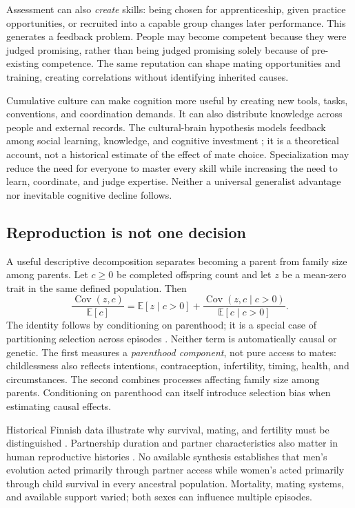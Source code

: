 \documentclass[10pt,twocolumn,letterpaper]{article}
\newcommand{\E}{\mathbb{E}}
\newcommand{\Cov}{\operatorname{Cov}}
\begin{document}
Assessment can also \emph{create} skills: being chosen for apprenticeship, given practice opportunities, or recruited into a capable group changes later performance. This generates a feedback problem. People may become competent because they were judged promising, rather than being judged promising solely because of pre-existing competence. The same reputation can shape mating opportunities and training, creating correlations without identifying inherited causes.

Cumulative culture can make cognition more useful by creating new tools, tasks, conventions, and coordination demands. It can also distribute knowledge across people and external records. The cultural-brain hypothesis models feedback among social learning, knowledge, and cognitive investment \citep{cultural}; it is a theoretical account, not a historical estimate of the effect of mate choice. Specialization may reduce the need for everyone to master every skill while increasing the need to learn, coordinate, and judge expertise. Neither a universal generalist advantage nor inevitable cognitive decline follows.

\subsection{Reproduction is not one decision}
A useful descriptive decomposition separates becoming a parent from family size among parents. Let $c\geq0$ be completed offspring count and let $z$ be a mean-zero trait in the same defined population. Then
\begin{equation}
\frac{\Cov(z,c)}{\E[c]}=
\E[z\mid c>0]+\frac{\Cov(z,c\mid c>0)}{\E[c\mid c>0]}.
\label{eq:episodes}
\end{equation}
The identity follows by conditioning on parenthood; it is a special case of partitioning selection across episodes \citep{arnold1984}. Neither term is automatically causal or genetic. The first measures a \emph{parenthood component}, not pure access to mates: childlessness also reflects intentions, contraception, infertility, timing, health, and circumstances. The second combines processes affecting family size among parents. Conditioning on parenthood can itself introduce selection bias when estimating causal effects.

Historical Finnish data illustrate why survival, mating, and fertility must be distinguished \citep{courtiol2012}. Partnership duration and partner characteristics also matter in human reproductive histories \citep{borgerhoffmulder2019}. No available synthesis establishes that men's evolution acted primarily through partner access while women's acted primarily through child survival in every ancestral population. Mortality, mating systems, and available support varied; both sexes can influence multiple episodes.
\end{document}
